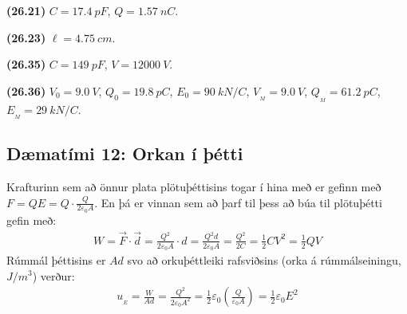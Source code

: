 \ifdefined \wholebook \else\documentclass[oneside]{book}\usepackage{EdlBook}\graphicspath{{figures/}}
\begin{document}
\begin{tcolorbox}
\begin{enumerate*}[label = \vspace{0.15cm} ]
  \item \textbf{(26.21)} $C = \SI{17.4}{pF}$, $Q = \SI{1.57}{nC}$.
  \item \textbf{(26.23)} $\ell = \SI{4.75}{cm}$.
  \item \textbf{(26.35)} $C = \SI{149}{pF}$, $V = \SI{12000}{V}$.
  \item \textbf{(26.36)} $V_0 = \SI{9.0}{V}$, $Q_0 = \SI{19.8}{pC}$, $E_0 = \SI{90}{kN/C}$, $V_{\!_M} = \SI{9.0}{V}$, $Q_{\!_M} = \SI{61.2}{pC}$, $E_{\!_M} = \SI{29}{kN/C}$. 
\end{enumerate*}
\end{tcolorbox}

\newpage

\subsection*{Dæmatími 12: Orkan í þétti}

\begin{tcolorbox}
Krafturinn sem að önnur plata plötuþéttisins togar í hina með er gefinn með $F = QE = Q \cdot \frac{Q}{2 \varepsilon_0 A}$. En þá er vinnan sem að þarf til þess að búa til plötuþétti gefin með:
\begin{align*}
    W = \vec{F} \cdot \vec{d} = \frac{Q^2}{2 \varepsilon_0 A} \cdot d = \frac{Q^2 d}{2 \varepsilon_0 A} = \frac{Q^2}{2C} = \frac{1}{2}CV^2 = \frac{1}{2}QV
\end{align*}
Rúmmál þéttisins er $Ad$ svo að orkuþéttleiki rafsviðsins (orka á rúmmálseiningu, $\si{J/m^3}$) verður:
\begin{align*}
    u_{\!_{E}} = \frac{W}{Ad} = \frac{Q^2}{2 \varepsilon_0 A^2} = \frac{1}{2} \varepsilon_0 \left( \frac{Q}{\varepsilon_0 A} \right) = \frac{1}{2} \varepsilon_0 E^2
\end{align*}
\end{tcolorbox}
\end{document}
